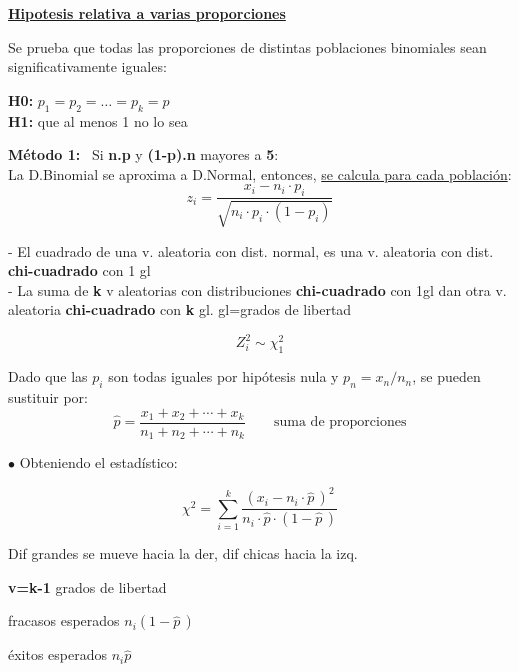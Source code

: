 \documentclass[10pt,a4paper]{article}
\begin{document}
{\large\bfseries\uline{Hipotesis relativa a varias proporciones}\par}
\vspace{2pt}

Se prueba que todas las proporciones de distintas poblaciones binomiales sean significativamente iguales:

\hspace{1.2cm}\textbf{H0:} $p_1 = p_2 = \ldots = p_k = p$ \\
\hspace*{1.2cm}\textbf{H1:} que al menos 1 no lo sea

\textbf{Método 1:} \ Si \textbf{n.p} y \textbf{(1-p).n} mayores a \textbf{5}: \\
La D.Binomial se aproxima a D.Normal, entonces, \uline{se calcula para cada población}:
\[
z_i = \frac{x_i - n_i\cdot p_i}{\sqrt{n_i\cdot p_i\cdot\left(1-p_i\right)}}
\]

\begin{minipage}{0.70\textwidth}
- El cuadrado de una v. aleatoria con dist. normal, es una v. aleatoria con dist. \textbf{chi-cuadrado} con 1 gl \\
- La suma de \textbf{k} v aleatorias con distribuciones \textbf{chi-cuadrado} con 1gl dan otra v. aleatoria \textbf{chi-cuadrado} con \textbf{k} gl. \hspace{0.8cm} gl=grados de libertad
\end{minipage}\hfill
\begin{minipage}{0.25\textwidth}
\[
Z_i^2 \sim \chi_1^2
\]
\end{minipage}

Dado que las $p_i$ son todas iguales por hipótesis nula y $p_n = x_n/n_n$, se pueden sustituir por:
\[
\widehat{p} = \frac{x_1 + x_2 + \cdots + x_k}{n_1 + n_2 + \cdots + n_k}
\qquad \text{suma de proporciones}
\]

$\bullet$ Obteniendo el estadístico:

\begin{minipage}{0.44\textwidth}
\[
\chi^2 = \sum_{i=1}^{k} \frac{\left(x_i - n_i\cdot\widehat{p}\,\right)^2}{n_i\cdot\widehat{p}\cdot\left(1-\widehat{p}\,\right)}
\]
\end{minipage}
\begin{minipage}{0.26\textwidth}
{\small Dif grandes se mueve hacia la der, dif chicas hacia la izq.\par
\textbf{v=k-1} grados de libertad\par}
\end{minipage}
\begin{minipage}{0.29\textwidth}
{\small fracasos esperados $n_i(1-\widehat{p}\,)$\par
éxitos esperados $n_i\widehat{p}$\par}
\end{minipage}
\end{document}
